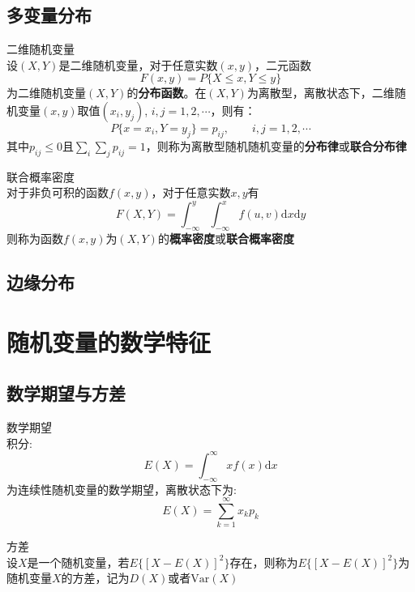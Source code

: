 \subsection{多变量分布}
\begin{definition}{二维随机变量\\}
    设$(X,Y)$是二维随机变量，对于任意实数$(x,y)$，二元函数$$F(x,y)=P\{ X\leq x, Y\leq y \}$$为二维随机变量$(X,Y)$的\textbf{分布函数}。在$(X,Y)$为离散型，离散状态下，二维随机变量$(x,y)$取值$(x_i,y_j)$, $i,j=1,2,\cdots$，则有：
    $$P\{x=x_i,Y=y_j\}=p_{ij},\qquad i,j=1,2,\cdots$$
    其中$p_{ij}\leq 0$且$\sum_i \sum_j p_{ij}=1$，则称为离散型随机随机变量的\textbf{分布律}或\textbf{联合分布律}
\end{definition}

\begin{definition}{联合概率密度\\}
    对于非负可积的函数$f(x,y)$，对于任意实数$x,y$有
    \begin{equation}
        F(X,Y)=\int_{-\infty}^{y}\int_{-\infty}^{x} f(u,v)\mathrm{d}x\mathrm{d}y
    \end{equation}
    则称为函数$f(x,y)$为$(X,Y)$的\textbf{概率密度}或\textbf{联合概率密度}
\end{definition}
\subsection{边缘分布}


\section{随机变量的数学特征}
\subsection{数学期望与方差}

\begin{definition}{数学期望}
    \\积分:
    \begin{equation}
        E(X)=\int_{-\infty}^{\infty}xf(x)\mathrm{d} x
    \end{equation}
    为连续性随机变量的数学期望，离散状态下为:
    \begin{equation}
        E(X)=\sum_{k=1}^{\infty}x_k p_k
    \end{equation}
\end{definition}
\begin{definition}{方差\\}
    设$X$是一个随机变量，若$E\{ [X-E(X)]^2 \}$存在，则称为$E\{ [X-E(X)]^2 \}$为随机变量$X$的方差，记为$D(X)$或者$\mathrm{Var}(X)$
\end{definition}


